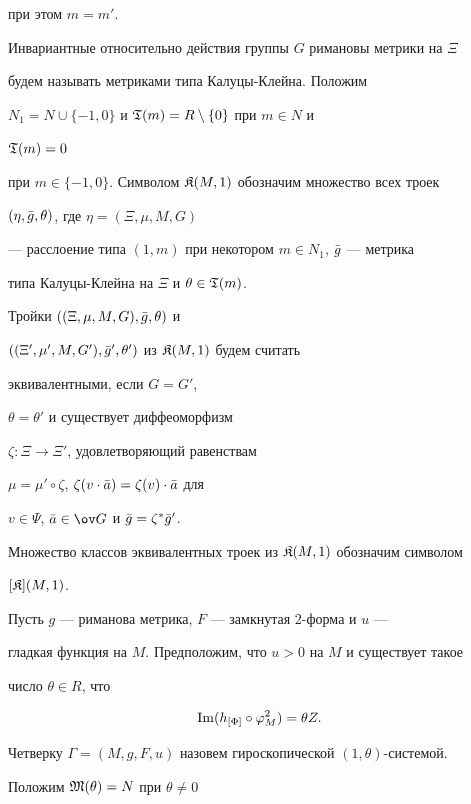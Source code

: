 при этом $m=m'$. 


 


Инвариантные относительно действия группы $G$ римановы метрики на $\Xi$ 


будем называть метриками типа Калуцы-Клейна. Положим 


$N_1=N\cup\{-1,0\}$ и $\frak T(m)=R\setminus\{0\}$ при $m\in N$ и 


$\frak T(m)=0$ 


при $m\in\{-1,0\}$. Символом $\frak K(M,1)$ обозначим множество всех троек 


$(\eta,\Bar g,\theta)$, где $\eta=(\Xi,\mu,M,G)$ 


--- расслоение типа $(1,m)$ при некотором $m\in N_1$, $\Bar g$ --- метрика 


типа Калуцы-Клейна на $\Xi$ и $\theta\in\frak T(m)$. 


Тройки $((\Xi,\mu,M,G),\Bar g,\theta)$ и 


$((\Xi',\mu',M,G'),\Bar g',\theta')$ из $\frak K(M,1)$ будем считать 


эквивалентными, если $G=G'$, 


$\theta=\theta'$ и существует диффеоморфизм 


$\zeta:\Xi\to\Xi'$, удовлетворяющий равенствам 


$\mu=\mu'\circ\zeta$, $\zeta(v\cdot\Bar a)=\zeta(v)\cdot\Bar a$ для 


$v\in\Psi$, $\Bar a\in\ov G$ и $\Bar g=\zeta^*\Bar g'$. 


Множество классов эквивалентных троек из $\frak K(M,1)$ обозначим символом 


$[\frak K](M,1)$. 


 


Пусть $g$ --- риманова метрика, $F$ --- замкнутая 2-форма и $u$ --- 


гладкая функция на $M$. Предположим, что $u>0$ на $M$ и существует такое 


число $\theta\in R$, что 


\begin{equation} 


\im(h_{[\Phi]}\circ\varphi^2_M)=\theta Z. 


\end{equation} 


Четверку $\Gamma=(M,g,F,u)$ назовем гироскопической $(1,\theta)$-системой. 


Положим $\frak M(\theta)=N$ при $\theta\ne 0$ 


